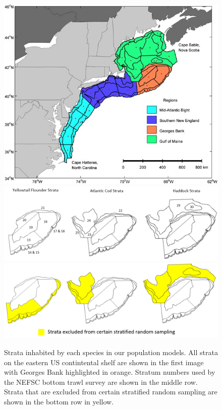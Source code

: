 \documentclass[
  12pt,
]{article}
\begin{document}
\begin{figure}

{\centering \includegraphics[width=0.95\linewidth]{Images/GB_strata} \includegraphics[width=0.95\linewidth]{Images/Strata2} \includegraphics[width=0.95\linewidth]{Images/Excluded_strata2} 

}

\caption{Strata inhabited by each species in our population models. All strata on the eastern US contintental shelf are shown in the first image with Georges Bank highlighted in orange. Stratum numbers used by the NEFSC bottom trawl survey are shown in the middle row. Strata that are excluded from certain stratified random sampling are shown in the bottom row in yellow.}\label{fig:strata-plot}
\end{figure}
\end{document}
